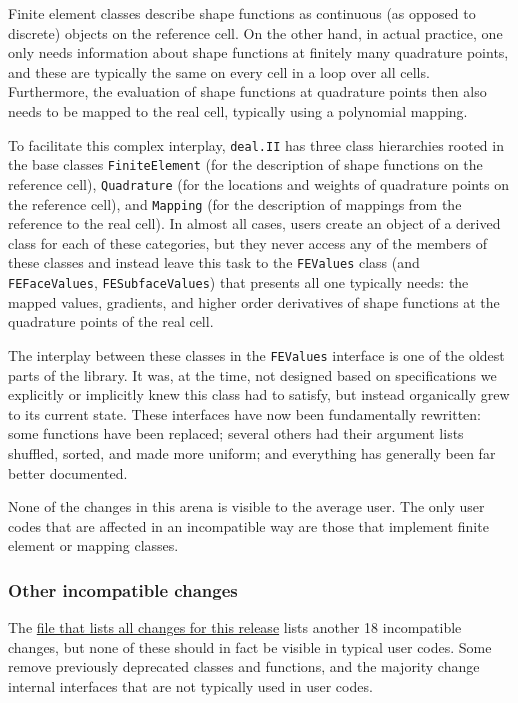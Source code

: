 \documentclass{ansarticle-preprint}
\newcommand{\specialword}[1]{\texttt{#1}}
\newcommand{\dealii}{{\specialword{deal.II}}}
\begin{document}
Finite element classes describe shape functions as continuous (as
opposed to discrete) objects on the reference cell. On the other hand,
in actual practice, one only needs information about shape functions
at finitely many quadrature points, and these are typically the same
on every cell in a loop over all cells. Furthermore, the evaluation of
shape functions at quadrature points then also needs to be mapped to
the real cell, typically using a polynomial mapping.

To facilitate this complex interplay, \dealii{} has three class
hierarchies rooted in the base classes \texttt{FiniteElement} (for the
description of shape functions on the reference cell),
\texttt{Quadrature} (for the locations and weights of quadrature
points on the reference cell), and \texttt{Mapping} (for the
description of mappings from the reference to the real cell). In
almost all cases, users create an object of a derived class for each
of these categories, but they never access any of the members of these
classes and instead leave this task to the \texttt{FEValues} class
(and \texttt{FEFaceValues}, \texttt{FESubfaceValues}) that presents
all one typically needs: the mapped values, gradients, and
higher order derivatives of shape functions at the quadrature points
of the real cell.

The interplay between these classes in the \texttt{FEValues} interface
is one of the oldest parts of the library. It was, at the time, not
designed based on specifications we explicitly or implicitly knew this
class had to satisfy, but instead organically grew to its current
state. These interfaces have now been fundamentally rewritten: some
functions have been replaced; several others had their argument lists
shuffled, sorted, and made more uniform; and everything has generally
been far better documented.

None of the changes in this arena is visible to the average user. The
only user codes that are affected in an incompatible way are those
that implement finite element or mapping classes.

\subsubsection{Other incompatible changes}

The
\href{https://www.dealii.org/8.4.0/doxygen/deal.II/changes_between_8_3_0_and_8_4.html}{file
  that lists all changes for this release} lists another 18
incompatible changes, but none of these should in fact be visible in
typical user codes. Some remove previously deprecated classes and
functions, and the majority change internal interfaces that are not
typically used in user codes.
\end{document}

